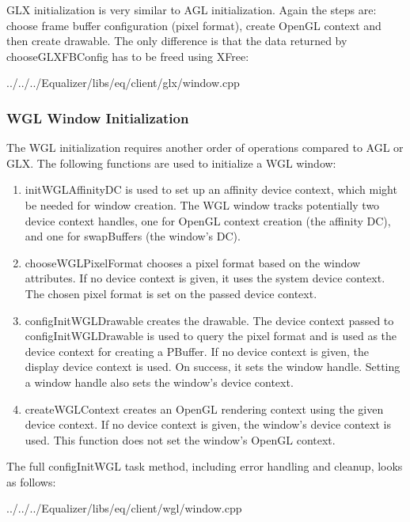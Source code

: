 \documentclass[10pt,a4]{scrartcl}
\begin{document}
GLX initialization is very similar to AGL initialization. Again the steps are:
choose frame buffer configuration (pixel format), create OpenGL context and then
create drawable. The only difference is that the data returned by
\textsf{chooseGLXFBConfig} has to be freed using \textsf{XFree}:

{\footnotesize
  {../../../Equalizer/libs/eq/client/glx/window.cpp}}


\subsubsection{WGL Window Initialization}

The WGL initialization requires another order of operations compared to
AGL or GLX. The following functions are used to initialize a WGL window:

\begin{enumerate}
\item\textsf{initWGLAffinityDC} is used to set up an affinity device
  context, which might be needed for window creation. The WGL window
  tracks potentially two device context handles, one for OpenGL context
  creation (the affinity DC), and one for \textsf{swapBuffers} (the
  window's DC).
\item\textsf{chooseWGLPixelFormat} chooses a pixel format based on the
  window attributes. If no device context is given, it uses the system
  device context. The chosen pixel format is set on the passed device
  context.
\item\textsf{configInitWGLDrawable} creates the drawable. The device
  context passed to \textsf{configInitWGLDrawable} is used to query the
  pixel format and is used as the device context for creating a
  PBuffer. If no device context is given, the display device context is
  used. On success, it sets the window handle. Setting a window handle
  also sets the window's device context.
\item\textsf{createWGLContext} creates an OpenGL rendering context using
  the given device context. If no device context is given, the window's
  device context is used. This function does not set the window's OpenGL
  context.
\end{enumerate}

The full \textsf{configInitWGL} task method, including error handling
and cleanup, looks as follows:

{\footnotesize
  {../../../Equalizer/libs/eq/client/wgl/window.cpp}}
\end{document}
